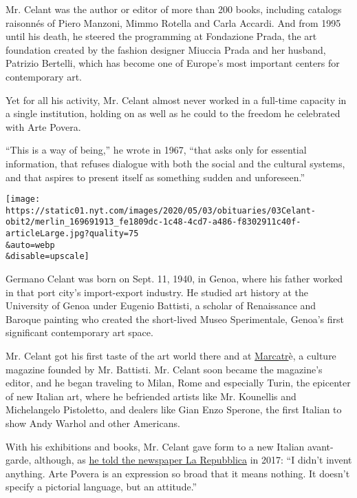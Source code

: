 Mr. Celant was the author or editor of more than 200 books, including
catalogs raisonnés of Piero Manzoni, Mimmo Rotella and Carla Accardi.
And from 1995 until his death, he steered the programming at Fondazione
Prada, the art foundation created by the fashion designer Miuccia Prada
and her husband, Patrizio Bertelli, which has become one of Europe's
most important centers for contemporary art.

Yet for all his activity, Mr. Celant almost never worked in a full-time
capacity in a single institution, holding on as well as he could to the
freedom he celebrated with Arte Povera.

``This is a way of being,'' he wrote in 1967, ``that asks only for
essential information, that refuses dialogue with both the social and
the cultural systems, and that aspires to present itself as something
sudden and unforeseen.''

\texttt{[image: https://static01.nyt.com/images/2020/05/03/obituaries/03Celant-obit2/merlin\_169691913\_fe1809dc-1c48-4cd7-a486-f8302911c40f-articleLarge.jpg?quality=75\\\&auto=webp\\\&disable=upscale]}

Germano Celant was born on Sept. 11, 1940, in Genoa, where his father
worked in that port city's import-export industry. He studied art
history at the University of Genoa under Eugenio Battisti, a scholar of
Renaissance and Baroque painting who created the short-lived Museo
Sperimentale, Genoa's first significant contemporary art space.

Mr. Celant got his first taste of the art world there and at
\href{http://www.capti.it/index.php?ParamCatID=10\&IDFascicolo=192\&artgal=38\&lang=EN}{Marcatr}è,
a culture magazine founded by Mr. Battisti. Mr. Celant soon became the
magazine's editor, and he began traveling to Milan, Rome and especially
Turin, the epicenter of new Italian art, where he befriended artists
like Mr. Kounellis and Michelangelo Pistoletto, and dealers like Gian
Enzo Sperone, the first Italian to show Andy Warhol and other Americans.

With his exhibitions and books, Mr. Celant gave form to a new Italian
avant-garde, although, as
\href{https://www.repubblica.it/cultura/2017/05/07/news/germano_celant_non_dite_che_ho_inventato_l_arte_povera_e_un_espressione_cosi_ampia_da_non_significare_nulla_-164857041/}{he
told the newspaper La Repubblica} in 2017: ``I didn't invent anything.
Arte Povera is an expression so broad that it means nothing. It doesn't
specify a pictorial language, but an attitude.''

